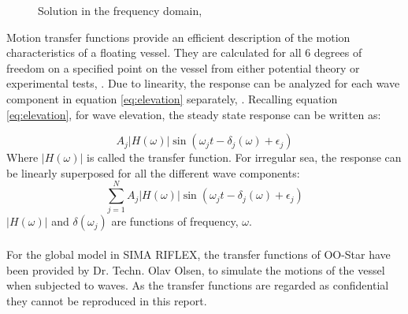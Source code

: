 \begin{figure}[H]
\hfill
{}\hfill
  \hfill
\caption[$\; \:$Solution in the frequency domain]{Solution in the frequency domain, \cite{Langen1999}}
\label{fig:transex}
\end{figure}

\noindent Motion transfer functions provide an efficient description of the motion characteristics of a floating vessel. They are calculated for all 6 degrees of freedom on a specified point on the vessel from either potential theory or experimental tests, \cite{sintef2017}. Due to linearity, the response can be analyzed for each wave component in equation \ref{eq:elevation} separately, \cite{Faltinsen1990}. Recalling equation \ref{eq:elevation}, for wave elevation, the steady state response can be written as:

\begin{equation}
    A_j |H(\omega)|\sin(\omega_jt-\delta_j(\omega)+\epsilon_j)
\end{equation}
Where $|H(\omega)|$ is called the transfer function. For irregular sea, the response can be linearly superposed for all the different wave components:
\begin{equation}
    \sum_{j=1}^N  A_j |H(\omega)|\sin(\omega_jt-\delta_j(\omega)+\epsilon_j)
\end{equation}
 $|H(\omega)|$ and $\delta(\omega_j)$ are functions of frequency, $\omega$.\\\\
For the global model in SIMA RIFLEX, the transfer functions of OO-Star have been provided by Dr. Techn. Olav Olsen, to simulate the motions of the vessel when subjected to waves. As the transfer functions are regarded as confidential they cannot be reproduced in this report.   

